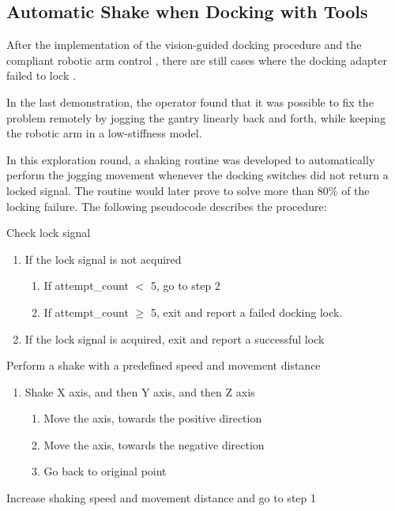 \subsection{Automatic Shake when Docking with Tools}
\label{subsection:exploration-5-automatic-shake-when-docking-with-tools}

After the implementation of the vision-guided docking procedure  and the compliant robotic arm control , there are still cases where the docking adapter failed to lock .

In the last demonstration, the operator found that it was possible to fix the problem remotely by jogging the gantry linearly back and forth, while keeping the robotic arm in a low-stiffness model. 

In this exploration round, a shaking routine was developed to automatically perform the jogging movement whenever the docking switches did not return a locked signal.
The routine would later prove to solve more than 80\% of the locking failure. The following pseudocode describes the procedure:

\begin{description}[nosep]
    
	\item[Step 1] Check lock signal
    \begin{enumerate}
        \item If the lock signal is not acquired
        \begin{enumerate}
            \item If attempt\_count $<$ 5, go to step 2
            \item If attempt\_count $\geq$ 5, exit and report a failed docking lock.
        \end{enumerate}
        \item If the lock signal is acquired, exit and report a successful lock
    \end{enumerate}

	\item[Step 2] Perform a shake with a predefined speed and movement distance
    \begin{enumerate}
        \item Shake X axis, and then Y axis, and then Z axis

        \begin{enumerate}
            \item Move the axis, towards the positive direction
            \item Move the axis, towards the negative direction
            \item Go back to original point
        \end{enumerate}
    \end{enumerate}

	\item[Step 3] Increase shaking speed and movement distance and go to step 1
\end{description}

